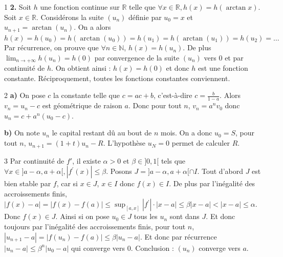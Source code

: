 \begin{correction}{1}
\textbf{2.} Soit $h$ une fonction continue sur $\mathbb{R}$ telle que $\forall x\in\mathbb{R}, h(x)=h(\arctan x)$.
Soit $x\in\mathbb{R}$. Considérons la suite $(u_{n})$ définie par $u_{0}=x$ et $u_{n+1}=\arctan(u_{n})$.
On a alors $h(x)=h(u_{0})=h(\arctan(u_{0}))=h(u_{1})=h(\arctan(u_{1}))=h(u_{2})=\dots$
Par récurrence, on prouve que $\forall n\in\mathbb{N}$, $h(x)=h(u_{n})$.
De plus $\lim_{n\rightarrow+\infty}h(u_{n})=h(0)$ par convergence de la suite $(u_{n})$ vers 0 et par continuité de $h$.
On obtient ainsi : $h(x)=h(0)$ et donc $h$ est une fonction constante.
Réciproquement, toutes les fonctions constantes conviennent.
\end{correction}

\begin{correction}{2}
\textbf{a)} On pose $c$ la constante telle que $c=ac+b$, c'est-à-dire $c=\frac{b}{1-a}$.
Alors $v_{n}=u_{n}-c$ est géométrique de raison $a$.
Donc pour tout $n$, $v_{n}=a^{n}v_{0}$ donc $u_{n}=c+a^{n}(u_{0}-c)$.

\textbf{b)} On note $u_{n}$ le capital restant dû au bout de $n$ mois.
On a donc $u_{0}=S$, pour tout $n$, $u_{n+1}=(1+t)u_{n}-R$.
L'hypothèse $u_{N}=0$ permet de calculer $R$.
\end{correction}

\begin{correction}{3}
Par continuité de $f'$, il existe $\alpha>0$ et $\beta\in]0,1[$ tels que $\forall x\in]a-\alpha,a+\alpha[, |f^{\prime}(x)|\le\beta$.
Posons $J=]a-\alpha,a+\alpha[\cap I$.
Tout d'abord $J$ est bien stable par $f$, car si $x\in J$, $x\in I$ donc $f(x)\in I$.
De plus par l'inégalité des accroissements finis, $|f(x)-a|=|f(x)-f(a)|\le \sup_{[a,x]}|f^{\prime}|\cdot|x-a|\le\beta|x-a| < |x-a| \le \alpha$. Donc $f(x)\in J$.
Ainsi si on pose $u_{0}\in J$ tous les $u_{n}$ sont dans $J$.
Et donc toujours par l'inégalité des accroissements finis, pour tout $n$, $|u_{n+1}-a|=|f(u_{n})-f(a)|\le\beta|u_{n}-a|$.
Et donc par récurrence $|u_{n}-a|\le\beta^{n}|u_{0}-a|$ qui converge vers 0. Conclusion : $(u_n)$ converge vers $a$.
\end{correction}

